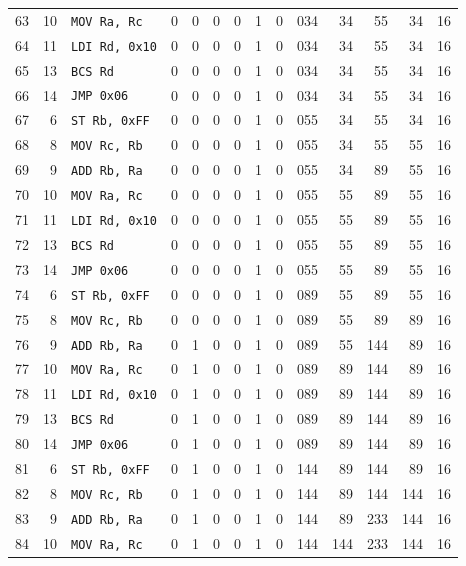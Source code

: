 \begin{longtable}{rrlcccccc r rrrr}
63 & 10 & \texttt{MOV Ra, Rc} & 0 & 0 & 0 & 0 & 1 & 0 & 034 & 34 & 55 & 34 & 16 \\
64 & 11 & \texttt{LDI Rd, 0x10} & 0 & 0 & 0 & 0 & 1 & 0 & 034 & 34 & 55 & 34 & 16 \\
65 & 13 & \texttt{BCS Rd} & 0 & 0 & 0 & 0 & 1 & 0 & 034 & 34 & 55 & 34 & 16 \\
66 & 14 & \texttt{JMP 0x06} & 0 & 0 & 0 & 0 & 1 & 0 & 034 & 34 & 55 & 34 & 16 \\
67 & 6 & \texttt{ST Rb, 0xFF} & 0 & 0 & 0 & 0 & 1 & 0 & 055 & 34 & 55 & 34 & 16 \\
68 & 8 & \texttt{MOV Rc, Rb} & 0 & 0 & 0 & 0 & 1 & 0 & 055 & 34 & 55 & 55 & 16 \\
69 & 9 & \texttt{ADD Rb, Ra} & 0 & 0 & 0 & 0 & 1 & 0 & 055 & 34 & 89 & 55 & 16 \\
70 & 10 & \texttt{MOV Ra, Rc} & 0 & 0 & 0 & 0 & 1 & 0 & 055 & 55 & 89 & 55 & 16 \\
71 & 11 & \texttt{LDI Rd, 0x10} & 0 & 0 & 0 & 0 & 1 & 0 & 055 & 55 & 89 & 55 & 16 \\
72 & 13 & \texttt{BCS Rd} & 0 & 0 & 0 & 0 & 1 & 0 & 055 & 55 & 89 & 55 & 16 \\
73 & 14 & \texttt{JMP 0x06} & 0 & 0 & 0 & 0 & 1 & 0 & 055 & 55 & 89 & 55 & 16 \\
74 & 6 & \texttt{ST Rb, 0xFF} & 0 & 0 & 0 & 0 & 1 & 0 & 089 & 55 & 89 & 55 & 16 \\
75 & 8 & \texttt{MOV Rc, Rb} & 0 & 0 & 0 & 0 & 1 & 0 & 089 & 55 & 89 & 89 & 16 \\
76 & 9 & \texttt{ADD Rb, Ra} & 0 & 1 & 0 & 0 & 1 & 0 & 089 & 55 & 144 & 89 & 16 \\
77 & 10 & \texttt{MOV Ra, Rc} & 0 & 1 & 0 & 0 & 1 & 0 & 089 & 89 & 144 & 89 & 16 \\
78 & 11 & \texttt{LDI Rd, 0x10} & 0 & 1 & 0 & 0 & 1 & 0 & 089 & 89 & 144 & 89 & 16 \\
79 & 13 & \texttt{BCS Rd} & 0 & 1 & 0 & 0 & 1 & 0 & 089 & 89 & 144 & 89 & 16 \\
80 & 14 & \texttt{JMP 0x06} & 0 & 1 & 0 & 0 & 1 & 0 & 089 & 89 & 144 & 89 & 16 \\
81 & 6 & \texttt{ST Rb, 0xFF} & 0 & 1 & 0 & 0 & 1 & 0 & 144 & 89 & 144 & 89 & 16 \\
82 & 8 & \texttt{MOV Rc, Rb} & 0 & 1 & 0 & 0 & 1 & 0 & 144 & 89 & 144 & 144 & 16 \\
83 & 9 & \texttt{ADD Rb, Ra} & 0 & 1 & 0 & 0 & 1 & 0 & 144 & 89 & 233 & 144 & 16 \\
84 & 10 & \texttt{MOV Ra, Rc} & 0 & 1 & 0 & 0 & 1 & 0 & 144 & 144 & 233 & 144 & 16 \\

\end{longtable}
